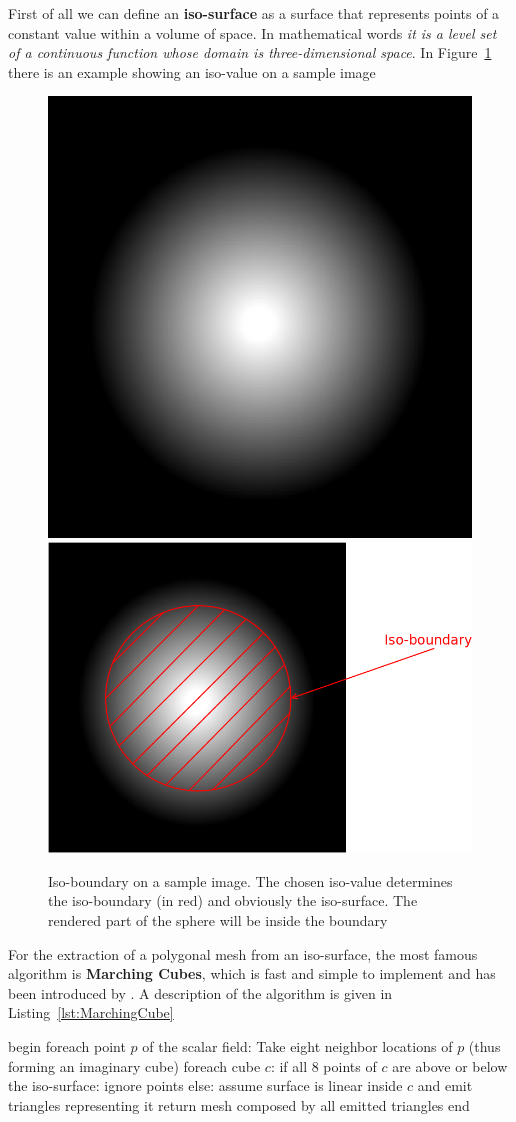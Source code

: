 First of all we can define an \textbf{iso-surface} as a surface that represents points of a constant value within a volume of space. In mathematical words \textit{it is a level set of a continuous function whose domain is three-dimensional space}. In Figure~\ref{fig:isosurface} there is an example showing an iso-value on a sample image

\begin{figure}[htb] %
   \centering
   \includegraphics[width=0.35\linewidth]{images/isosurface0.png}
   \includegraphics[width=0.45\linewidth]{images/isosurface1.png}
   \caption[Iso-boundary on a sample image]{Iso-boundary on a sample image. The chosen iso-value determines the iso-boundary (in red) and obviously the iso-surface. The rendered part of the sphere will be inside the boundary}
   \label{fig:isosurface}
\end{figure}

For the extraction of a polygonal mesh from an iso-surface, the most famous algorithm is \textbf{Marching Cubes}, which is fast and simple to implement and has been introduced by \cite{Lorensen}. A description of the algorithm is given in Listing~\ref{lst:MarchingCube}
\newpage

\begin{pseudo}[caption={Marching Cube algorithm}, label={lst:MarchingCube}]
begin
 foreach point $p$ of the scalar field:
   Take eight neighbor locations of $p$ (thus forming an imaginary cube)
 foreach cube $c$:
   if all 8 points of $c$ are above or below the iso-surface:
     ignore points
   else:
     assume surface is linear inside $c$ and emit triangles representing it 
 return mesh composed by all emitted triangles
end       
\end{pseudo}

